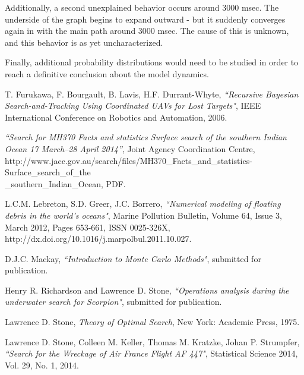 \documentclass[a4paper]{article}
\begin{document}
Additionally, a second unexplained behavior occurs around 3000 msec. The underside of the graph begins to expand outward - but it suddenly converges again in with the main path around 3000 msec. The cause of this is unknown, and this behavior is as yet uncharacterized. 

Finally, additional probability distributions would need to be studied in order to reach a definitive conclusion about the model dynamics.

\pagebreak

\begin{thebibliography}{10}
 T. Furukawa, F. Bourgault, B. Lavis, H.F. Durrant-Whyte, \emph{``Recursive Bayesian Search-and-Tracking Using Coordinated UAVs for Lost Targets"}, IEEE International Conference on Robotics and Automation, 2006. 

 \emph{``Search for MH370 Facts and statistics Surface search of the southern Indian Ocean 17 March–28 April 2014''}, Joint Agency Coordination Centre, \\http://www.jacc.gov.au/search/files/MH370\_Facts\_and\_statistics-Surface\_search\_of\_the\\\_southern\_Indian\_Ocean, PDF.

 L.C.M. Lebreton, S.D. Greer, J.C. Borrero, \emph{``Numerical modeling of floating debris in the world’s oceans"}, Marine Pollution Bulletin, Volume 64, Issue 3, March 2012, Pages 653-661, ISSN 0025-326X, http://dx.doi.org/10.1016/j.marpolbul.2011.10.027.

 D.J.C. Mackay, \emph{``Introduction to Monte Carlo Methods"}, submitted for publication.

 Henry R. Richardson and Lawrence D. Stone, \emph{``Operations analysis during the underwater search for Scorpion"}, submitted for publication. 

 Lawrence D. Stone, \textit{Theory of Optimal Search}, New York: Academic Press, 1975.

 Lawrence D. Stone, Colleen M. Keller, Thomas M. Kratzke, Johan P. Strumpfer, \emph{``Search for the Wreckage of Air France Flight AF 447"}, Statistical Science 2014, Vol. 29, No. 1, 2014.
\end{thebibliography}
\end{document}
